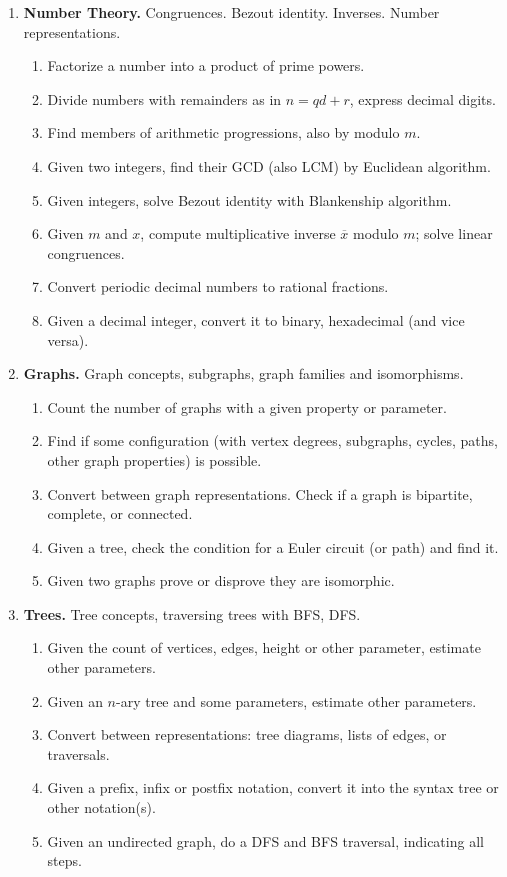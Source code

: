 \documentclass[a4paper,12pt]{article}
\begin{document}
{\small
\begin{enumerate}

\item \textbf{Number Theory.} Congruences. Bezout identity. Inverses. Number representations.
\begin{enumerate}
\item Factorize a number into a product of prime powers.
\item Divide numbers with remainders as in $n = qd + r$, express decimal digits.
\item Find members of arithmetic progressions, also by modulo $m$.
\item Given two integers, find their GCD (also LCM) by Euclidean algorithm.
\item Given integers, solve Bezout identity with Blankenship algorithm.
\item Given $m$ and $x$, compute
multiplicative inverse $\overline{x}$ modulo $m$; solve linear congruences.
\item Convert periodic decimal numbers to rational fractions.
\item Given a decimal integer, convert it to binary, hexadecimal (and vice versa).
\end{enumerate}

\item \textbf{Graphs.} Graph concepts, subgraphs, graph families and isomorphisms.
\begin{enumerate}
\item Count the number of graphs with a given property or parameter.
\item Find if some configuration (with vertex degrees, subgraphs, cycles, paths,
other graph properties) is possible.
\item Convert between graph representations.
Check if a graph is bipartite, complete, or connected.
\item Given a tree, check the condition for a Euler circuit (or path) and find it.
\item Given two graphs prove or disprove they are isomorphic.
\end{enumerate}

\item \textbf{Trees.} Tree concepts, traversing trees with BFS, DFS.
\begin{enumerate}
\item Given the count of vertices, edges, height or other parameter, estimate other parameters.
\item Given an $n$-ary tree and some parameters, estimate other parameters.
\item Convert between representations: tree diagrams, lists of edges, or traversals.
\item Given a prefix, infix or postfix notation, convert it into the syntax tree or other notation(s).
\item Given an undirected graph, do a DFS and BFS traversal, indicating all steps.
\end{enumerate}
\end{enumerate}
}
\end{document}
